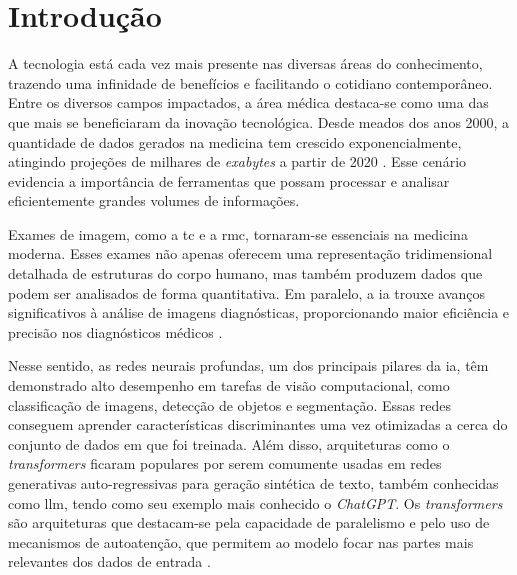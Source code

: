 
\chapter[Introdução]{Introdução}
\label{chap:introducao}
\vspace{-\baselineskip} %

A tecnologia está cada vez mais presente nas diversas áreas do conhecimento, trazendo uma infinidade de benefícios e facilitando o cotidiano contemporâneo. Entre os diversos campos impactados, a área médica destaca-se como uma das que mais se beneficiaram da inovação tecnológica. Desde meados dos anos 2000, a quantidade de dados gerados na medicina tem crescido exponencialmente, atingindo projeções de milhares de \textit{exabytes} a partir de 2020 \cite{gantzDIGITALUNIVERSE2020}. Esse cenário evidencia a importância de ferramentas que possam processar e analisar eficientemente grandes volumes de informações.

Exames de imagem, como a \gls{tc} e a \gls{rmc}, tornaram-se essenciais na medicina moderna. Esses exames não apenas oferecem uma representação tridimensional detalhada de estruturas do corpo humano, mas também produzem dados que podem ser analisados de forma quantitativa. Em paralelo, a \gls{ia} trouxe avanços significativos à análise de imagens diagnósticas, proporcionando maior eficiência e precisão nos diagnósticos médicos \cite{argentieroApplicationsArtificialIntelligence2022}.

Nesse sentido, as redes neurais profundas, um dos principais pilares da \gls{ia}, têm demonstrado alto desempenho em tarefas de visão computacional, como classificação de imagens, detecção de objetos e segmentação. Essas redes conseguem aprender características discriminantes uma vez otimizadas a cerca do conjunto de dados em que foi treinada. Além disso, arquiteturas como o \textit{transformers} ficaram populares por serem comumente usadas em redes generativas auto-regressivas para geração sintética de texto, também conhecidas como \gls{llm}, tendo como seu exemplo mais conhecido o \textit{ChatGPT}. Os \textit{transformers} são arquiteturas que destacam-se pela capacidade de paralelismo e pelo uso de mecanismos de autoatenção, que permitem ao modelo focar nas partes mais relevantes dos dados de entrada \cite{russell2020artificial}.

